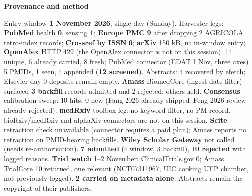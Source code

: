 \documentclass[10pt]{article}
\begin{document}


\vspace{2mm}

\begin{keybox}
{\sffamily\bfseries\footnotesize\color{Deep}Provenance and method}\\[1.2mm]
{\fontsize{7.2}{8.8}\selectfont
Entry window \textbf{1 November 2026}, single day (Sunday). Harvester legs: \textbf{PubMed} health \textbf{0}, sensing \textbf{1}; \textbf{Europe PMC}
\textbf{9} after dropping 2 AGRICOLA retro-index records; \textbf{Crossref by ISSN} \textbf{6}; \textbf{arXiv} 150 kB, no in-window entry; \textbf{OpenAlex} HTTP 429 (the OpenAlex connector
is not on this session). 14 unique, 6 already carried, 8 fresh; PubMed connector (EDAT 1 Nov, three axes) 5 PMIDs, 1 seen, 4 appended (\textbf{12 screened}). Abstracts: 4 recovered by efetch; Elsevier
day-0 deposits remain empty. \textbf{Amass} BiomedCore (ingest date filter) surfaced \textbf{3 backfill} records admitted and 2 rejected; others held. \textbf{Consensus} calibration sweep: 10 hits, 0 new (Fang 2026 already shipped; Feng 2026 review already rejected).
\textbf{medRxiv} toolbox leg: no keyword filter, no PM record. bioRxiv/medRxiv and alphaXiv connectors are not on this session. \textbf{Scite} retraction check unavailable (connector requires a paid plan); Amass reports no retraction on PMID-bearing backfills. \textbf{Wiley Scholar Gateway} not called (needs re-authorisation).
\textbf{7 admitted} (4 window, 3 backfill), \textbf{10 rejected} with logged reasons. \textbf{Trial watch} 1--2 November: ClinicalTrials.gov 0; Amass TrialCore 10 returned, one relevant (NCT07311967, UIC cooking UFP chamber, not previously logged). \textbf{2 carried on metadata alone}.
Abstracts remain the copyright of their publishers.\par}
\end{keybox}
\end{document}
